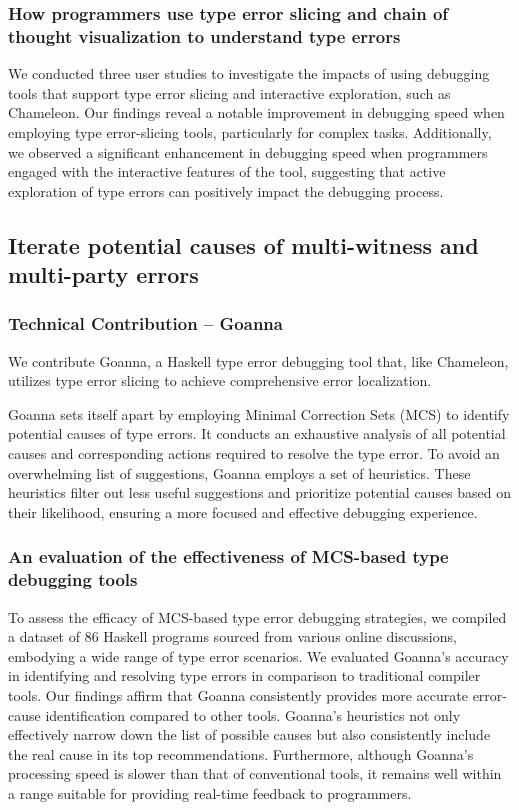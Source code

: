 \subsubsection{How programmers use type error slicing and chain of thought visualization to understand type errors}
We conducted three user studies to investigate the impacts of using debugging tools that support type error slicing and interactive exploration, such as Chameleon. Our findings reveal a notable improvement in debugging speed when employing type error-slicing tools, particularly for complex tasks. Additionally, we observed a significant enhancement in debugging speed when programmers engaged with the interactive features of the tool, suggesting that active exploration of type errors can positively impact the debugging process.

\subsection{Iterate potential causes of multi-witness and multi-party errors}

\subsubsection{Technical Contribution -- Goanna}

We contribute Goanna, a Haskell type error debugging tool that, like Chameleon, utilizes type error slicing to achieve comprehensive error localization.

Goanna sets itself apart by employing Minimal Correction Sets (MCS) to identify potential causes of type errors. It conducts an exhaustive analysis of all potential causes and corresponding actions required to resolve the type error. To avoid an overwhelming list of suggestions, Goanna employs a set of heuristics. These heuristics filter out less useful suggestions and prioritize potential causes based on their likelihood, ensuring a more focused and effective debugging experience.


\subsubsection{An evaluation of the effectiveness of MCS-based type debugging tools}
To assess the efficacy of MCS-based type error debugging strategies, we compiled a dataset of 86 Haskell programs sourced from various online discussions, embodying a wide range of type error scenarios. We evaluated Goanna's accuracy in identifying and resolving type errors in comparison to traditional compiler tools. Our findings affirm that Goanna consistently provides more accurate error-cause identification compared to other tools. Goanna's heuristics not only effectively narrow down the list of possible causes but also consistently include the real cause in its top recommendations. Furthermore, although Goanna's processing speed is slower than that of conventional tools, it remains well within a range suitable for providing real-time feedback to programmers. 

